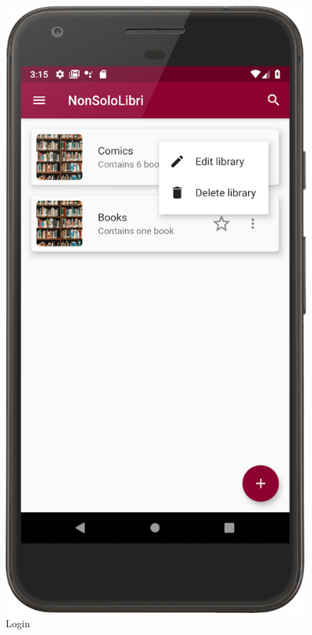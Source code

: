 \begin{figure}[!htb]
\begin{minipage}[b]{0.3\textwidth}
        \caption{Login}
        \label{ref:loginpage}
    \end{minipage}
    \hfill
    \begin{minipage}[b]{0.3\textwidth}
        \includegraphics[scale=1]{images/libraries-page.png}

\end{minipage}
\end{figure}
